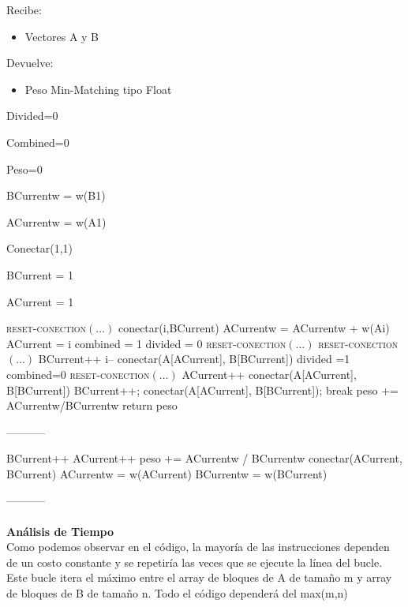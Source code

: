 \documentclass{article}
\newcommand{\TITLE}[1]{\item[#1]}
\newcommand{\algcost}[2]{\strut\hfill\makebox[1.5cm][l]{#1}\makebox[4cm][l]{#2}}
\begin{document}
	Recibe: 
	\begin{itemize}
		\item Vectores A y B
	\end{itemize}
	Devuelve: 
	\begin{itemize}
		\item Peso Min-Matching tipo Float
	\end{itemize}
	\begin{algorithmic}[1]
		\TITLE{\textsc{Min-Matching-Voraz}$(A, B)$}
		\algcost{\textit{cost}}{\textit{times}}
		\STATE Divided=0 \algcost{$.$}{$.$}
		\STATE Combined=0 \algcost{$.$}{$.$}
		\STATE Peso=0 \algcost{$.$}{$.$} 
		\STATE BCurrentw = w(B1) \algcost{$.$}{$.$} 
		\STATE ACurrentw = w(A1) \algcost{$.$}{$.$} 
		\STATE Conectar(1,1) \algcost{$.$}{$.$} 
		\STATE BCurrent = 1 \algcost{$.$}{$.$} 
		\STATE ACurrent = 1\algcost{$.$}{$.$} 
		\STATE \textsc{reset-conection}$(...)$ 
		\ELSE 
		\STATE conectar(i,BCurrent)
		\STATE	ACurrentw = ACurrentw + w(Ai)
		\STATE	ACurrent = i
		\STATE	combined = 1
		\STATE	divided = 0
		\ENDIF
		\ELSE 
		\STATE \textsc{reset-conection}$(...)$ 
		\ENDIF
		\ELSE
		\STATE \textsc{reset-conection}$(...)$ 
		\ELSE 
		\STATE BCurrent++
		\STATE i--
		\STATE conectar(A[ACurrent], B[BCurrent])
		\STATE divided =1
		\STATE combined=0
		\ENDIF
		\ELSE
		\STATE  \textsc{reset-conection}$(...)$ 
		\ENDIF
		\STATE ACurrent++
		\STATE conectar(A[ACurrent], B[BCurrent])
		\ELSE 
			\STATE BCurrent++;
			\STATE conectar(A[ACurrent], B[BCurrent]);
		\STATE break
		\ENDIF
		\ENDIF
		\ENDIF
		\ENDFOR
		\STATE peso += ACurrentw/BCurrentw
		\STATE return peso
	\end{algorithmic}
-----------\\
	\begin{algorithmic}[1] 
	\TITLE{\textsc{Reset-conection}$( ... )$}
	\STATE BCurrent++
	\STATE ACurrent++
	\STATE peso += ACurrentw / BCurrentw 
	\STATE conectar(ACurrent, BCurrent)
	\STATE ACurrentw = w(ACurrent) 
	\STATE BCurrentw = w(BCurrent)
	\end{algorithmic}

-----------\\\\
	\textbf{Análisis de Tiempo}\\
	Como podemos observar en el código, la mayoría de las instrucciones dependen de un costo constante y se repetiría las veces que se ejecute la línea del bucle.\\Este bucle itera el máximo entre el array de bloques de A de tamaño m y  array de bloques de B de tamaño n. Todo el código dependerá del max(m,n)\\
	
\end{document}
